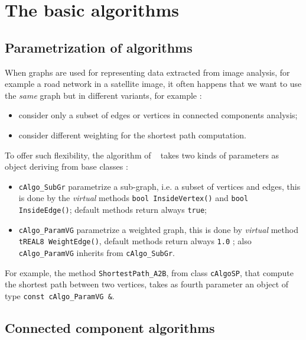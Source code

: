 \section{The basic algorithms}
\label{Graph:AlgoBasic}


\subsection{Parametrization of algorithms}

When graphs are used for representing data extracted from image analysis, for example a road
network in a satellite image, it often happens that we want to use the \emph{same} graph 
but in different variants, for example :

\begin{itemize}
    \item  consider only a subset of edges or vertices in connected components analysis;
    \item  consider different weighting for the shortest path computation.
\end{itemize}

To offer such flexibility, the algorithm of \PPP~ takes two kinds of parameters as object
deriving from base classes :

\begin{itemize}
    \item   {\tt cAlgo\_SubGr} parametrize a sub-graph, i.e. a subset of vertices and edges,
            this is done by the \emph{virtual} methods {\tt bool InsideVertex()} and {\tt bool InsideEdge()};
            default methods return always {\tt true};

    \item   {\tt cAlgo\_ParamVG} parametrize a weighted graph, this is done by  \emph{virtual} method
            {\tt tREAL8 WeightEdge()}, default methods return always {\tt 1.0} ;
            also {\tt cAlgo\_ParamVG} inherits from  {\tt cAlgo\_SubGr}.
\end{itemize}

For example, the method {\tt ShortestPath\_A2B}, from class {\tt cAlgoSP}, that compute the shortest path
between two vertices, takes as fourth parameter an object of type {\tt const cAlgo\_ParamVG \&}.



\subsection{Connected component algorithms}

